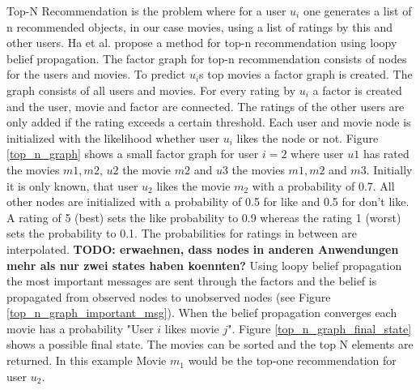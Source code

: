 Top-N Recommendation is the problem where for a user $u_i$ one generates a list of n recommended objects, in our case movies, using a list of ratings by this and other users. Ha et al. \cite{Ha:2012:TRT:2396761.2398636} propose a method for top-n recommendation using loopy belief propagation. The factor graph for top-n recommendation consists of nodes for the users and movies. To predict $u_i$s top movies a factor graph is created. The graph consists of all users and movies. For every rating by $u_i$ a factor is created and the user, movie and factor are connected. The ratings of the other users are only added if the rating exceeds a certain threshold. Each user and movie node is initialized with the likelihood whether user $u_i$ likes the node or not. Figure \ref{top_n_graph} shows a small factor graph for user $i=2$ where user $u1$ has rated the movies $m1,m2$, $u2$ the movie $m2$ and $u3$ the movies $m1,m2$ and $m3$. Initially it is only known, that user $u_2$ likes the movie $m_2$ with a probability of 0.7. All other nodes are initialized with a probability of 0.5 for like and 0.5 for don't like. A rating of 5 (best) sets the like probability to 0.9 whereas the rating 1 (worst) sets the probability to 0.1. The probabilities for ratings in between are interpolated. \textbf{TODO: erwaehnen, dass nodes in anderen Anwendungen mehr als nur zwei states haben koennten?}
Using loopy belief propagation the most important messages are sent through the factors and the belief is propagated from observed nodes to unobserved nodes (see Figure \ref{top_n_graph_important_msg}). When the belief propagation converges each movie has a probability "User $i$ likes movie $j$". Figure \ref{top_n_graph_final_state} shows a possible final state. The movies can be sorted and the top N elements are returned. In this example Movie $m_1$ would be the top-one recommendation for user $u_2$.

